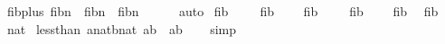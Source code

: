 \begin{isabellebody}
\ fib{}{\isacharunderscore}plus{\isacharunderscore}{}{\isacharcolon}\ {\isachardoublequoteopen}fib{}{\isacharparenleft}n{\isacharplus}{}{\isacharparenright}\ {\isacharequal}\ fib{}{\isacharparenleft}n{\isacharplus}{}{\isacharparenright}\ {\isacharplus}\ fib{}{\isacharparenleft}n{\isacharparenright}\ {\isacharplus}\ {}{\isachardoublequoteclose}\isanewline
%
\isadelimproof
\ \ %
\endisadelimproof
%
\isatagproof
{}\isamarkupfalse%
\ auto%
\endisatagproof
{\isafoldproof}%
%
\isadelimproof
\isanewline
%
\endisadelimproof
\isanewline
{}\isamarkupfalse%
\ {\isachardoublequoteopen}{\isacharparenleft}{\isacharparenleft}fib\ {}{\isacharparenright}\ {\isacharminus}\ {}{\isacharparenright}{\isacharasterisk}{}{}\ {\isacharplus}\ {\isacharparenleft}fib{}\ {}{\isacharparenright}\ {\isacharminus}\ {\isacharparenleft}{}{\isacharparenright}{\isachardoublequoteclose}\isanewline
{}\isamarkupfalse%
\ {\isachardoublequoteopen}{\isacharparenleft}{\isacharparenleft}fib\ {}{}{\isacharparenright}\ {\isacharminus}\ {}{\isacharparenright}{\isacharasterisk}{}{}\ {\isacharplus}\ {\isacharparenleft}fib{}\ {}{}{\isacharparenright}\ {\isacharminus}\ {\isacharparenleft}{}{}{\isacharparenright}{\isachardoublequoteclose}\isanewline
\isanewline
{}\isamarkupfalse%
\ {\isachardoublequoteopen}fib\ {}{\isachardoublequoteclose}\isanewline
{}\isamarkupfalse%
\ {\isachardoublequoteopen}fib{}\ {}{\isachardoublequoteclose}\isanewline
{}\isamarkupfalse%
\ {\isachardoublequoteopen}{}{}{\isacharcolon}{\isacharcolon}nat{\isachardoublequoteclose}\isanewline
\isanewline
\isanewline
\isanewline
\isanewline
\isanewline
\isanewline
{}\isamarkupfalse%
\ less{\isacharunderscore}than{\isacharcolon}\ {\isachardoublequoteopen}{\isasymlbrakk}{\isacharparenleft}a{\isacharcolon}{\isacharcolon}nat{\isacharparenright}{\isasymle}{\isacharparenleft}b{\isacharcolon}{\isacharcolon}nat{\isacharparenright}{\isacharsemicolon}\ a{\isasymnoteq}b{\isasymrbrakk}\ {\isasymLongrightarrow}\ a{\isacharless}b{\isachardoublequoteclose}\isanewline
%
\isadelimproof
\ \ %
\endisadelimproof
%
\isatagproof
{}\isamarkupfalse%
\ simp%
\endisatagproof
{\isafoldproof}%
%

\end{isabellebody}
